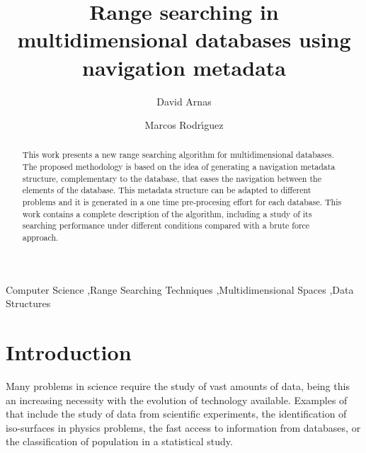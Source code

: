 \documentclass[review]{elsarticle}
\begin{document}
\begin{frontmatter}

\title{Range searching in multidimensional databases using navigation metadata}


\author{David Arnas}
\address{Massachusetts Institute of Technology, Cambridge, MA, 02139, USA.}
\author{Marcos Rodr\'{\i}guez}\address{Universidad de Zaragoza, Pedro Cerbuna 12, 50009 Zaragoza, Spain.}


\begin{abstract}
This work presents a new range searching algorithm for multidimensional databases. The proposed methodology is based on the idea of generating a navigation metadata structure, complementary to the database, that eases the navigation between the elements of the database. This metadata structure  can be adapted to different problems and it is generated in a one time pre-procesing effort for each database. This work contains a complete description of the algorithm, including a study of its searching performance under different conditions compared with a brute force approach.
\end{abstract}

\begin{keyword}
Computer Science \sep Range Searching Techniques \sep Multidimensional Spaces \sep Data Structures
\end{keyword}

\end{frontmatter}

\linenumbers

\section{Introduction}
\label{sec:intro}

Many problems in science require the study of vast amounts of data, being this an increasing necessity with the evolution of technology available. Examples of that include the study of data from scientific experiments, the identification of iso-surfaces in physics problems, the fast access to information from databases, or the classification of population in a statistical study.
\end{document}

